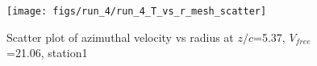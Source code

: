 \begin{figure}[H]
\centering
\texttt{[image: figs/run\_4/run\_4\_T\_vs\_r\_mesh\_scatter]}
\caption{Scatter plot of azimuthal velocity vs radius at $z/c$=5.37, $V_{free}$=21.06, station1}
\label{fig:run_4_T_vs_r_mesh_scatter}
\end{figure}


